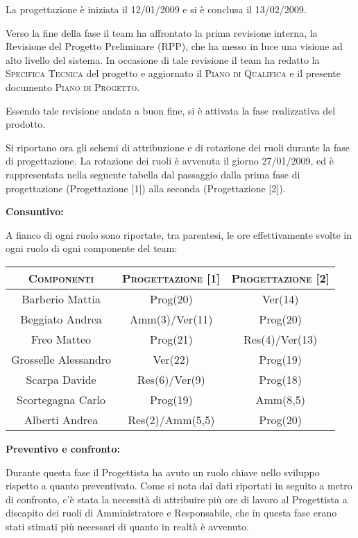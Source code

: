 \documentclass[11pt,a4paper]{article}
\begin{document}
La progettazione è iniziata il 12/01/2009 e si è conclusa il 13/02/2009.

Verso la fine della fase il team ha affrontato la prima revisione interna, la Revisione del Progetto Preliminare (RPP), che ha messo in luce una visione ad alto livello del sistema.
In occasione di tale revisione il team ha redatto la \textsc{Specifica Tecnica} del progetto e aggiornato il \textsc{Piano di Qualifica} e il presente documento \textsc{Piano di Progetto}.

Essendo tale revisione andata a buon fine, si è attivata la fase realizzativa del prodotto.

Si riportano ora gli schemi di attribuzione e di rotazione dei ruoli durante la fase di progettazione.
La rotazione dei ruoli è avvenuta il giorno 27/01/2009, ed è rappresentata nella seguente tabella dal passaggio dalla prima fase di progettazione (Progettazione [1]) alla seconda (Progettazione [2]).

\bigskip \bigskip
\begin{large}\textbf{Consuntivo:}\end{large}
\newline
A fianco di ogni ruolo sono riportate, tra parentesi, le ore effettivamente svolte in ogni ruolo di ogni componente del team:
\\
\begin{center}
\begin{tabular}{|c||c|c|}
\hline
\textsc{Componenti} & \textsc{Progettazione [1]} & \textsc{Progettazione [2]} \\ \hline \hline
Barberio Mattia & Prog(20) & Ver(14) \\ \hline
Beggiato Andrea & Amm(3)/Ver(11) & Prog(20) \\ \hline
Freo Matteo & Prog(21) & Res(4)/Ver(13) \\ \hline
Grosselle Alessandro & Ver(22) & Prog(19) \\ \hline
Scarpa Davide & Res(6)/Ver(9) & Prog(18) \\ \hline
Scortegagna Carlo & Prog(19) & Amm(8,5) \\ \hline
Alberti Andrea & Res(2)/Amm(5,5) & Prog(20) \\ \hline
\end{tabular}
\end{center}

\bigskip \bigskip
\begin{large}\textbf{Preventivo e confronto:}\end{large}
\newline
Durante questa fase il Progettista ha avuto un ruolo chiave nello sviluppo rispetto a quanto preventivato. Come si nota dai dati riportati in seguito a metro di confronto, c'è stata la necessità di attribuire più ore di lavoro al Progettista a discapito dei ruoli di Amministratore e Responsabile, che in questa fase erano stati stimati più necessari di quanto in realtà è avvenuto.
\end{document}

